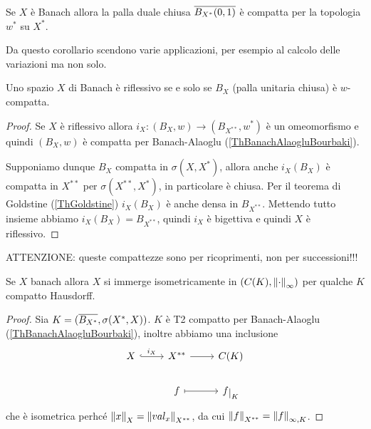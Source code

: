 \begin{corollary}
Se $X$ \`e Banach allora la palla duale chiusa $\overline{B_{X^\ast}(0,1)}$ \`e compatta per la topologia $w^\ast$ su $X^\ast$.
\end{corollary}

\begin{remark}
Da questo corollario scendono varie applicazioni, per esempio al calcolo delle variazioni ma non solo.
\end{remark}



\begin{theorem}[Kakutani]\label{ThKakutani}
Uno spazio $X$ di Banach \`e riflessivo se e solo se $B_X$ (palla unitaria chiusa) \`e $w$-compatta.
\end{theorem}
\begin{proof}
Se $X$ \`e riflessivo allora $i_X: (B_{X}, w)\to (B_{X^{\ast\ast}},w^\ast)$ \`e un omeomorfismo e quindi $(B_X,w)$ \`e compatta per Banach-Alaoglu (\ref{ThBanachAlaogluBourbaki}).

Supponiamo dunque $B_X$ compatta in $\sigma(X,X^\ast)$, allora anche $i_X(B_X)$ \`e compatta in $X^{\ast\ast}$ per $\sigma(X^{\ast\ast},X^\ast)$, in particolare \`e chiusa. Per il teorema di Goldstine (\ref{ThGoldstine}) $i_X(B_X)$ \`e anche densa in $B_{X^{\ast\ast}}$. Mettendo tutto insieme abbiamo $i_X(B_X)=B_{X^{\ast\ast}}$, quindi $i_X$ \`e bigettiva e quindi $X$ \`e riflessivo.
\end{proof}

\begin{remark}
ATTENZIONE: queste compattezze sono per ricoprimenti, non per successioni!!!
\end{remark}

\begin{proposition}\label{PrBanchSiImmergonoInContinueSuCompatto}
Se $X$ banach allora $X$ si immerge isometricamente in $(C(K),{\left\Vert{\cdot}\right\Vert}_\infty)$ per qualche $K$ compatto Hausdorff.
\end{proposition}
\begin{proof}
Sia $K=(\overline{B_{X^\ast}},\sigma(X^\ast,X))$. $K$ \`e T2 compatto per Banach-Alaoglu (\ref{ThBanachAlaogluBourbaki}), inoltre abbiamo una inclusione
\[\begin{tikzcd}
	X & {X^{\ast\ast}} & {C(K)} \\
	& f & {f\res K}
	\arrow["{i_X}", hook, from=1-1, to=1-2]
	\arrow[from=1-2, to=1-3]
	\arrow[maps to, from=2-2, to=2-3]
\end{tikzcd}\]
che \`e isometrica perhc\'e $\left\Vert{x}\right\Vert_X=\left\Vert{val_x}\right\Vert_{X^{\ast\ast}}$, da cui $\left\Vert{f}\right\Vert_{X^{\ast\ast}}=\left\Vert{f}\right\Vert_{\infty,K}$.
\end{proof}


